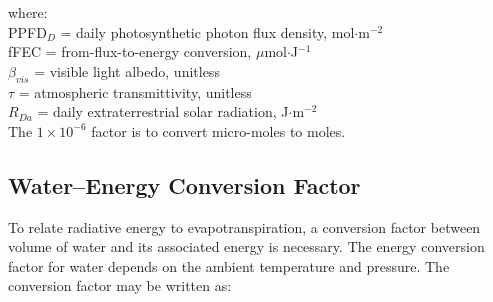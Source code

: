 \noindent where: \\
\indent PPFD$_D$ = daily photosynthetic photon flux density, mol$\cdot$m$^{-2}$\\
\indent fFEC = from-flux-to-energy conversion, $\mu$mol$\cdot$J$^{-1}$\\
\indent $\beta_{vis}$ = visible light albedo, unitless \\
\indent $\tau$ = atmospheric transmittivity, unitless \\
\indent $R_{Da}$ = daily extraterrestrial solar radiation, J$\cdot$m$^{-2}$\\

\noindent The $1\times 10^{-6}$ factor is to convert micro-moles to moles.

\subsection{Water--Energy Conversion Factor}
\label{sec:econ}
To relate radiative energy to evapotranspiration, a conversion factor between volume of water and its associated energy is necessary. 
The energy conversion factor for water depends on the ambient temperature and pressure. The conversion factor may be written as:

